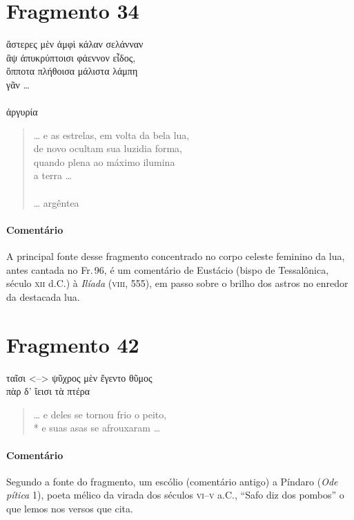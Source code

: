 \section{Fragmento 34}

\begin{gkverse}
ἄστερες μὲν ἀμφὶ κάλαν σελάνναν\\
ἂψ ἀπυκρύπτοισι φάεννον εἶδος,\\
ὄπποτα πλήθοισα μάλιστα λάμπη\\
γᾶν \ldots{}\\
\ast\quad\ast\quad\ast\\
ἀργυρία
\end{gkverse}

\begin{verse}
\ldots{} e as estrelas, em volta da bela lua,\\
de novo ocultam sua luzidia forma,\\
quando plena ao máximo ilumina\\
a terra \ldots{}\\
\ast\quad\ast\quad\ast\\
\ldots{} argêntea
\end{verse}

{\paragraph{Comentário} A principal fonte desse fragmento concentrado no corpo celeste feminino da lua, antes cantada no Fr.\,96, é
um comentário de Eustácio (bispo de Tessalônica, século \textsc{xii} d.C.) à
\textit{Ilíada }(\textsc{viii}, 555), em passo sobre o brilho dos astros no enredor da destacada lua.} 


\pagebreak
\section{Fragmento 42}

\begin{gkverse}
ταῖσι <--> ψῦχρος μὲν ἔγεντο θῦμος\\
πὰρ δ’ ἴεισι τὰ πτέρα
\end{gkverse}

\begin{verse}
\ldots{} e deles se tornou frio o peito,\\*
e suas asas se afrouxaram \ldots{}
\end{verse}

{\paragraph{Comentário} Segundo a fonte do fragmento, um escólio (comentário antigo) a Píndaro
(\textit{Ode pítica} 1), poeta mélico da virada dos séculos \textsc{vi}--\textsc{v} a.C.,
``Safo diz dos pombos” o que lemos nos versos que cita.}


